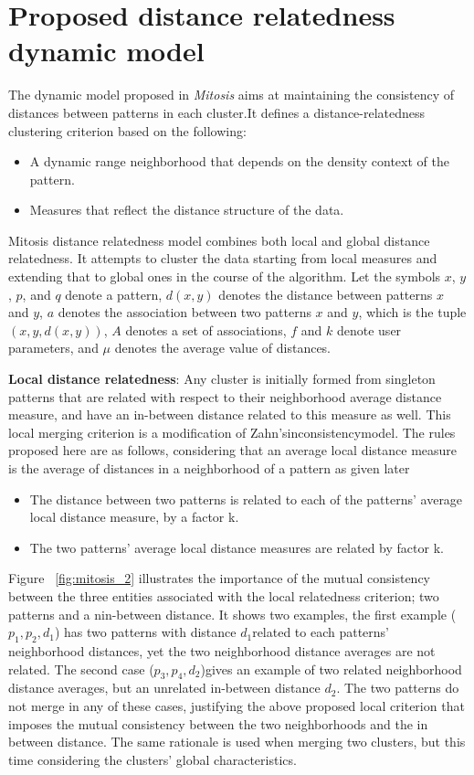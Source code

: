 \section{Proposed distance relatedness dynamic model}
The dynamic model proposed in \textit{Mitosis} aims at maintaining the consistency of distances between patterns in each cluster.It defines a
distance-relatedness clustering criterion based on the following:
\begin{itemize}
\item A dynamic range neighborhood that depends on the density context of the pattern.
\item Measures that reflect the distance structure of the data.
\end{itemize}

Mitosis distance relatedness model combines both local and global distance relatedness. 
It attempts to cluster the data starting from local measures and extending that to global ones in the course of the algorithm. 
Let the symbols $x$, $y$, $p$, and $q$ denote a pattern, $d(x,y)$ denotes the distance between patterns $x$ and $y$, $a$ denotes the association between two patterns $x$ and $y$, which is the tuple $(x,y,d(x,y))$, $A$ denotes a set of associations, $f$ and $k$ denote user parameters, and $\mu$ denotes the average value of distances.

\textbf{Local distance relatedness}: Any cluster is initially formed from singleton patterns that are related with respect to their neighborhood
average distance measure, and have an in-between distance related to this measure as well. This local merging criterion is a modification of Zahn'sinconsistencymodel.
The rules proposed here are as follows, considering that an average local distance measure is the average of distances in a neighborhood of a pattern as given later
\begin{itemize}
\item The distance between two patterns is related to each of the patterns' average local distance measure, by a factor k.
\item The two patterns' average local distance measures are related by factor k.
\end{itemize}

Figure ~\ref{fig:mitosis_2} illustrates the importance of the mutual consistency between the three entities associated with the local relatedness
criterion; two patterns and a nin-between distance. It shows two examples, the first example ($p_1, p_2, d_1$) has two patterns with distance $d_1$related to each patterns' neighborhood distances, yet the two neighborhood distance averages are not related. The second case ($p_3, p_4, d_2$)gives an example of two related neighborhood distance averages, but an unrelated in-between distance $d_2$. The two patterns do not merge in any of these cases, justifying the above proposed local criterion that imposes the mutual consistency between the two neighborhoods and the in between distance. 
The same rationale is used when merging two clusters, but this time considering the clusters' global characteristics.

